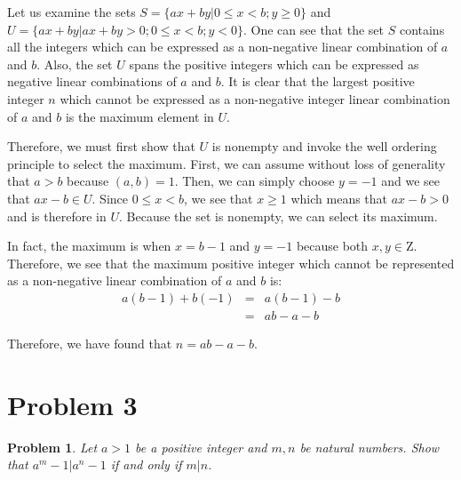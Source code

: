 \documentclass[psamsfonts]{amsart}
\newtheorem{prob}{Problem}[section]
\newenvironment{sol}{{\bfseries Solution}}{\qedsymbol}
\theoremstyle{definition}
\theoremstyle{remark}
\numberwithin{equation}{section}
\begin{document}
\begin{sol}
Let us examine the sets $S = \{ ax + by | 0 \leq x < b; y \geq 0 \}$ and $U = \{ ax + by | ax+by > 0; 0 \leq x < b; y < 0 \}$. One can see that the set $S$ contains all the integers which can be expressed as a non-negative linear combination of $a$ and $b$. Also, the set $U$ spans the positive integers which can be expressed as negative linear combinations of $a$ and $b$. It is clear that the largest positive integer $n$ which cannot be expressed as a non-negative integer linear combination of $a$ and $b$ is the maximum element in $U$.

Therefore, we must first show that $U$ is nonempty and invoke the well ordering principle to select the maximum. First, we can assume without loss of generality that $a > b$ because $(a,b) = 1$. Then, we can simply choose $y = -1$ and we see that $ax - b \in U$. Since $0 \leq x < b$, we see that $x \geq 1$ which means that $ax - b > 0$ and is therefore in $U$. Because the set is nonempty, we can select its maximum. 

In fact, the maximum is when $x = b - 1$ and $y = -1$ because both $x, y \in \mathrm{Z}$. Therefore, we see that the maximum positive integer which cannot be represented as a non-negative linear combination of $a$ and $b$ is:
\begin{eqnarray}
a(b-1) + b(-1) &=& a(b-1) - b \nonumber \\
&=& ab - a - b
\end{eqnarray} 

Therefore, we have found that $n = ab - a - b$.
\end{sol}

\section{Problem 3}
\begin{prob}
Let $a > 1$ be a positive integer and $m,n$ be natural numbers. Show that $a^m - 1 | a^n - 1$ if and only if $m | n$. 
\end{prob}
\end{document}
